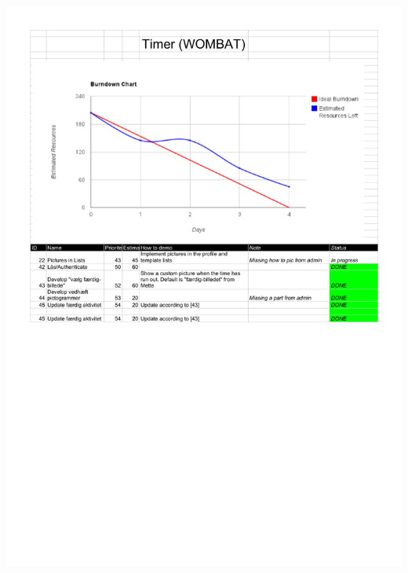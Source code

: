 \begin{center}
		\includegraphics[width=\textwidth]{Development/burndown_charts/Sprint_6.pdf}
	\end{center}